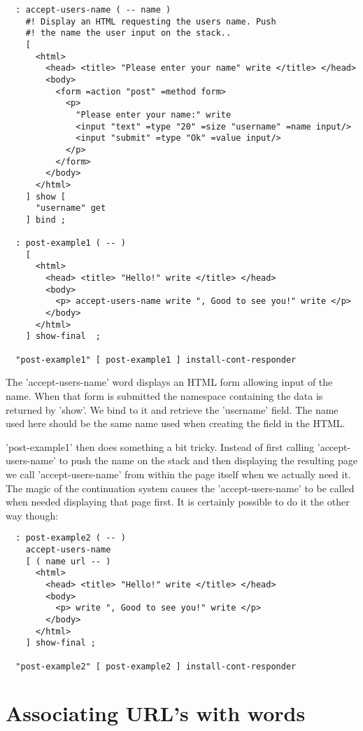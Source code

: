 \begin{verbatim}
  : accept-users-name ( -- name )
    #! Display an HTML requesting the users name. Push
    #! the name the user input on the stack..
    [
      <html>
        <head> <title> "Please enter your name" write </title> </head>
        <body>
          <form =action "post" =method form>
            <p> 
              "Please enter your name:" write
              <input "text" =type "20" =size "username" =name input/>
              <input "submit" =type "Ok" =value input/>
            </p>
          </form>
        </body>
      </html>
    ] show [
      "username" get
    ] bind ;

  : post-example1 ( -- )
    [
      <html>
        <head> <title> "Hello!" write </title> </head>
        <body>
          <p> accept-users-name write ", Good to see you!" write </p>
        </body>
      </html>
    ] show-final  ;
    
  "post-example1" [ post-example1 ] install-cont-responder
\end{verbatim}
    
The 'accept-users-name' word displays an HTML form allowing input of
the name. When that form is submitted the namespace containing the
data is returned by 'show'. We bind to it and retrieve the 'username'
field. The name used here should be the same name used when creating
the field in the HTML.

'post-example1' then does something a bit tricky. Instead of first
calling 'accept-users-name' to push the name on the stack and then
displaying the resulting page we call 'accept-users-name' from within
the page itself when we actually need it. The magic of the
continuation system causes the 'accept-users-name' to be called when
needed displaying that page first. It is certainly possible to do it
the other way though:

\begin{verbatim}
  : post-example2 ( -- )
    accept-users-name
    [ ( name url -- )
      <html>
        <head> <title> "Hello!" write </title> </head>
        <body>
          <p> write ", Good to see you!" write </p>
        </body>
      </html>
    ] show-final ;

  "post-example2" [ post-example2 ] install-cont-responder
\end{verbatim}

\section{Associating URL's with words}

